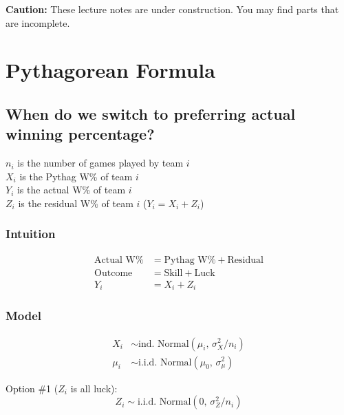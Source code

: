 \documentclass{article}
\begin{document}
  \begin{framed}
    {\bf Caution:} These lecture notes are under construction. You may find parts that are incomplete.
  \end{framed}

  \section{\sc Pythagorean Formula}

    \subsection{\sc When do we switch to preferring actual winning percentage?}

      $n_i$ is the number of games played by team $i$\\
      $X_i$ is the Pythag W\% of team $i$\\
      $Y_i$ is the actual W\% of team $i$\\
      $Z_i$ is the residual W\% of team $i$ ($Y_i = X_i + Z_i$)

      \subsubsection*{\sc Intuition}

      \begin{align*}
        \mbox{Actual W\%} &= \mbox{Pythag W\%} + \mbox{Residual}\\
        \mbox{Outcome} &= \mbox{Skill} + \mbox{Luck}\\
        Y_i &= X_i + Z_i
      \end{align*}

      \subsubsection*{\sc Model}

      \begin{align*}
        X_i &\sim \mbox{ind. Normal}(\mu_i,\, \sigma^2_X / n_i)\\
        \mu_i &\sim \mbox{i.i.d. Normal}(\mu_0,\, \sigma^2_\mu)
      \end{align*}

      Option \#1 ($Z_i$ is all luck):
      \begin{equation*}
        Z_i \sim \mbox{i.i.d. Normal}(0,\, \sigma^2_Z / n_i)
      \end{equation*}
\end{document}
